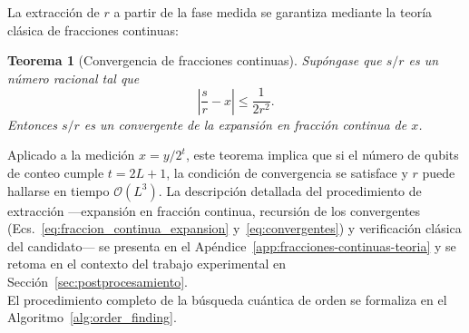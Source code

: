 \documentclass[12pt, spanish]{book}
\newtheorem{teorema}{Teorema}
\begin{document}
La extracción de $r$ a partir de la fase medida se garantiza mediante la teoría clásica de fracciones continuas:
\begin{teorema}[Convergencia de fracciones continuas]
    \label{thm:fracciones_continuas}
    Supóngase que $s/r$ es un número racional tal que
    \begin{equation}
        \left| \frac{s}{r} - x \right| \leq \frac{1}{2r^2}.
        \label{eq:fracciones_continuas}
    \end{equation}
    Entonces $s/r$ es un convergente de la expansión en fracción continua de $x$.
\end{teorema}
Aplicado a la medición $x = y/2^t$, este teorema implica que si el número de qubits de conteo cumple $t = 2L + 1$, la condición de convergencia se satisface y $r$ puede hallarse en tiempo $\mathcal{O}(L^3)$. La descripción detallada del procedimiento de extracción —expansión en fracción continua, recursión de los convergentes (Ecs.~\ref{eq:fraccion_continua_expansion} y~\ref{eq:convergentes}) y verificación clásica del candidato— se presenta en el Apéndice~\ref{app:fracciones-continuas-teoria} y se retoma en el contexto del trabajo experimental en Sección~\ref{sec:postprocesamiento}.\\

El procedimiento completo de la búsqueda cuántica de orden se formaliza en el Algoritmo~\ref{alg:order_finding}.
\end{document}
